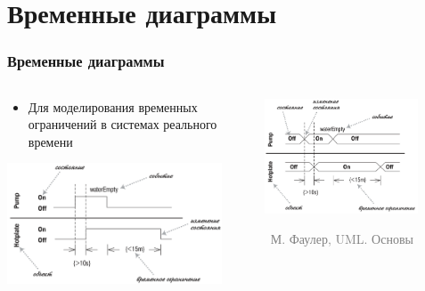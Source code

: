 \documentclass[xetex,mathserif,serif]{beamer}
\newcommand{\attribution}[1] {
    \vspace{-5mm}\begin{flushright}\begin{scriptsize}\textcolor{gray}{\textcopyright\, #1}\end{scriptsize}\end{flushright}
}
\begin{document}
    \section{Временные диаграммы}

    \begin{frame}
        \frametitle{Временные диаграммы}
        \begin{columns}
            \begin{column}{0.5\textwidth}
                \begin{itemize}
                    \item Для моделирования временных ограничений в системах реального времени
                \end{itemize}
                \vspace{3mm}
                \begin{center}
                    \includegraphics[width=0.9\textwidth]{timingDiagrams.png}
                \end{center}
            \end{column}
            \begin{column}{0.5\textwidth}
                \begin{center}
                    \includegraphics[width=0.8\textwidth]{timingDiagramsAlternate.png}
                    \attribution{М. Фаулер, UML. Основы}
                \end{center}
            \end{column}
        \end{columns}
    \end{frame}
\end{document}
